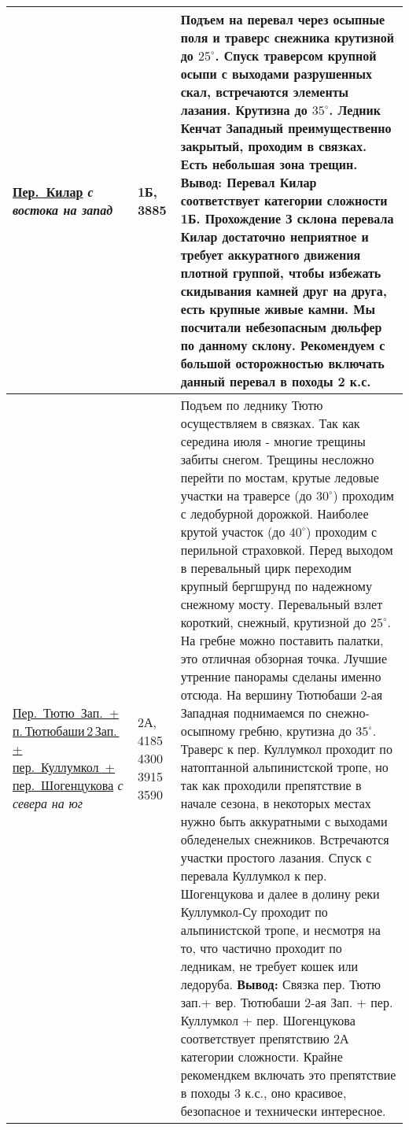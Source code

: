 {\begin{longtable}{|>{\centering\arraybackslash}m{3.8cm}|>{\centering\arraybackslash}m{1.3cm}|>{\raggedright\arraybackslash}m{12.5cm}|}
			\hyperref[subsec:Day16]{Пер.~Килар}																		\newline\textit{с востока на запад}		&	1Б, 3885					&	Подъем на перевал через осыпные поля и траверс снежника крутизной до $25^\circ$. Спуск траверсом крупной осыпи с выходами разрушенных скал, встречаются элементы лазания. Крутизна до $35^\circ$. Ледник Кенчат Западный преимущественно закрытый, проходим в связках. Есть небольшая зона трещин. \newline \textbf{Вывод:} Перевал Килар соответствует категории сложности 1Б. Прохождение З склона перевала Килар достаточно неприятное и требует аккуратного движения плотной группой, чтобы избежать скидывания камней друг на друга, есть крупные живые камни. Мы посчитали небезопасным дюльфер по данному склону. Рекомендуем с большой осторожностью включать данный перевал в походы 2 к.с.																																																																																																																																																																																																																																																																																																																																																	\\ \hline
			\hyperref[subsec:Day17]{Пер.~Тютю~Зап.~+ п.\,Тютюбаши\,2\,Зап.\,+ пер.~Куллумкол~+ пер.~Шогенцукова}	\newline\textit{с севера на юг}			&	2А,	4185 4300 3915 3590		&	Подъем по леднику Тютю осуществляем в связках. Так как середина июля - многие трещины забиты снегом. Трещины несложно перейти по мостам, крутые ледовые участки на траверсе (до $30^\circ$) проходим с ледобурной дорожкой. Наиболее крутой участок (до $40^\circ$) проходим с перильной страховкой. Перед выходом в перевальный цирк переходим крупный бергшрунд по надежному снежному мосту. Перевальный взлет короткий, снежный, крутизной до $25^\circ$. На гребне можно поставить палатки, это отличная обзорная точка. Лучшие утренние панорамы сделаны именно отсюда. На вершину Тютюбаши 2-ая Западная поднимаемся по снежно-осыпному гребню, крутизна до $35^\circ$. Траверс к пер. Куллумкол проходит по натоптанной альпинистской тропе, но так как проходили препятствие в начале сезона, в некоторых местах нужно быть аккуратными с выходами обледенелых снежников. Встречаются участки простого лазания. Спуск с перевала Куллумкол к пер. Шогенцукова и далее в долину реки Куллумкол-Су проходит по альпинистской тропе, и несмотря на то, что частично проходит по ледникам, не требует кошек или ледоруба. \newline \textbf{Вывод:} Связка пер. Тютю зап.+ вер. Тютюбаши 2-ая Зап. + пер. Куллумкол + пер. Шогенцукова соответствует препятствию 2А категории сложности. Крайне рекомендкем включать это препятствие в походы 3 к.с., оно красивое, безопасное и технически интересное.																																																																																																																																																														\\ \hline
		\end{longtable}}
		\setlength{\arraycolsep}{5pt}
		\renewcommand{\arraystretch}{1.8}

